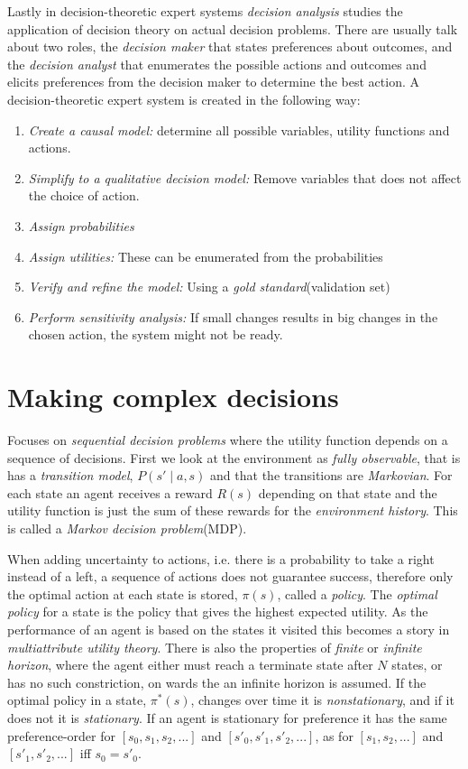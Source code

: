 \documentclass[11pt, letterpaper]{report}
\numberwithin{equation}{section}
\begin{document}
Lastly in decision-theoretic expert systems \emph{decision analysis} studies the
application of decision theory on actual decision problems. There are usually
talk about two roles, the \emph{decision maker} that states preferences about
outcomes, and the \emph{decision analyst} that enumerates the possible actions
and outcomes and elicits preferences from the decision maker to determine the
best action. A decision-theoretic expert system is created in the following way:
\begin{enumerate}
\item \emph{Create a causal model:} determine all possible variables, utility
  functions and actions.
\item \emph{Simplify to a qualitative decision model:} Remove variables that
  does not affect the choice of action.
\item \emph{Assign probabilities}
\item \emph{Assign utilities:} These can be enumerated from the probabilities
\item \emph{Verify and refine the model:} Using a \emph{gold
    standard}(validation set)
\item \emph{Perform sensitivity analysis:} If small changes results in big
  changes in the chosen action, the system might not be ready.
\end{enumerate}

\section{Making complex decisions}
Focuses on \emph{sequential decision problems} where the utility function
depends on a sequence of decisions. First we look at the environment as \emph{fully
  observable}, that is has a \emph{transition model}, $P(s' \mid a,s)$ and that
the transitions are \emph{Markovian}. For each state an agent receives a reward
$R(s)$ depending on that state and the utility function is just the sum of these
rewards for the \emph{environment history}. This is called a \emph{Markov
  decision problem}(MDP).

When adding uncertainty to actions, i.e. there is a probability to take a right
instead of a left, a sequence of actions does not guarantee success, therefore
only the optimal action at each state is stored, $\pi(s)$, called a
\emph{policy}. The \emph{optimal policy} for a state is the policy that gives
the highest expected utility. As the performance of an agent is based on the
states it visited this becomes a story in \emph{ multiattribute utility theory}.
There is also the properties of \emph{finite} or \emph{infinite horizon}, where
the agent either must reach a terminate state after $N$ states, or has no such
constriction, on wards the an infinite horizon is assumed. If the optimal policy in a
state, $\pi^\ast(s)$, changes over time it is \emph{nonstationary}, and if it
does not it is \emph{stationary}. If an agent is stationary for preference it
has the same preference-order for $[s_0,s_1,s_2,...]$ and
$[s'_0,s'_1,s'_2,...]$, as for $[s_1,s_2,...]$ and $[s'_1,s'_2,...]$ iff $s_0=s'_0$.
\end{document}
